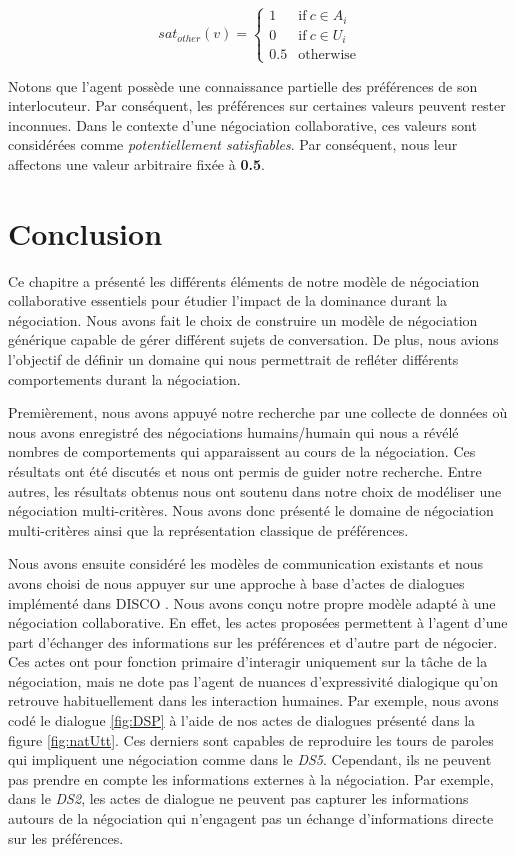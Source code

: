 					\begin{equation}
					sat_{other}(v)= \left\{\begin{array}{ll}
					1	 & \mathrm{if\ }  c \in A_i\\
					0    & \mathrm{if\ }c \in U_i\\
					0.5	 & \mathrm{otherwise}
					\end{array}\right.
					\end{equation}
					
				Notons que l'agent possède une connaissance partielle des préférences de son interlocuteur. Par conséquent, les préférences sur certaines valeurs peuvent rester inconnues. Dans  le contexte d'une négociation collaborative, ces valeurs sont considérées comme \textit{potentiellement satisfiables}. Par conséquent, nous leur affectons une valeur arbitraire fixée à \textbf{0.5}.
				
	\section{Conclusion}
			Ce chapitre a présenté les différents éléments de notre modèle de négociation collaborative essentiels pour étudier l'impact de la dominance durant la négociation. Nous avons fait le choix de construire un modèle de négociation générique capable de gérer différent sujets de conversation. De plus, nous avions l'objectif de définir un domaine qui nous permettrait de refléter différents comportements durant la négociation. 
			
			Premièrement, nous avons appuyé notre recherche par une collecte de données où nous avons enregistré des négociations humains/humain qui nous a révélé nombres de comportements qui apparaissent au cours de la négociation. Ces résultats ont été discutés et nous ont permis de guider notre recherche. Entre autres, les résultats obtenus nous ont soutenu dans notre choix de modéliser une négociation  multi-critères.
			Nous avons donc présenté le domaine de négociation multi-critères ainsi que la représentation classique de préférences.
			
			Nous avons ensuite considéré les modèles de communication existants et nous avons choisi de nous appuyer sur une approche à base d'actes de dialogues implémenté dans DISCO \cite{rich09}. Nous avons conçu notre propre modèle adapté à une négociation collaborative. En effet, les actes proposées permettent à l'agent d'une part d'échanger des informations sur les préférences et d'autre part de négocier. Ces actes ont pour fonction primaire d'interagir uniquement sur la tâche de la négociation, mais ne dote pas l'agent de nuances d'expressivité dialogique qu'on retrouve habituellement dans les interaction humaines.
			Par exemple, nous avons codé le dialogue \ref{fig:DSP} à l'aide de nos actes de dialogues présenté dans la figure \ref{fig:natUtt}. Ces derniers sont capables de reproduire les tours de paroles qui impliquent une négociation comme dans le \emph{DS5}. Cependant, ils ne peuvent pas prendre en compte les informations externes à la négociation. Par exemple, dans le \emph{DS2}, les actes de dialogue ne peuvent pas capturer les informations autours de la négociation qui n'engagent pas un échange d'informations directe sur les préférences.
			
